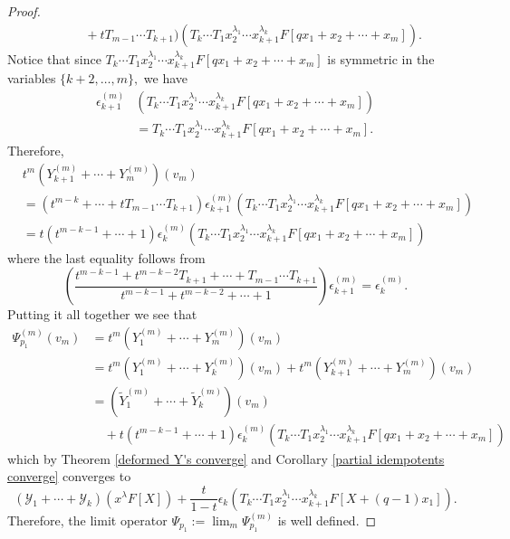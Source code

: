 \documentclass[ALCO,Unicode]{cedram}
\newcommand{\y}{{ \mathscr{Y} }}
\begin{document}
\begin{proof}
\begin{align*}
          & \qquad + tT_{m-1}\cdots T_{k+1}) \left( T_{k}\cdots T_1x_2^{\lambda_1}\cdots x_{k+1}^{\lambda_{k}}F[qx_1+x_2+ \cdots + x_m] \right).
    \end{align*}
Notice that since $T_{k}\cdots T_1x_2^{\lambda_1}\cdots x_{k+1}^{\lambda_{k}}F[qx_1+x_2+ \cdots + x_m]$ is symmetric in the variables $\{k+2,\ldots,m\},$ we have
\begin{align*}
\epsilon_{k+1}^{(m)}&(T_{k}\cdots T_1x_2^{\lambda_1}\cdots x_{k+1}^{\lambda_{k}}F[qx_1+x_2+ \cdots + x_m]) \\
&= T_{k}\cdots T_1x_2^{\lambda_1}\cdots x_{k+1}^{\lambda_{k}}F[qx_1+x_2+ \cdots + x_m].
\end{align*}
Therefore, 
\begin{align*}
    &t^m(Y_{k+1}^{(m)}+ \cdots + Y_{m}^{(m)})(v_m) \\
    &= (t^{m-k}+\cdots+ tT_{m-1}\cdots T_{k+1})\epsilon_{k+1}^{(m)}(T_{k}\cdots T_1x_2^{\lambda_1}\cdots x_{k+1}^{\lambda_{k}}F[qx_1+x_2+ \cdots + x_m]) \\
    &= t(t^{m-k-1}+ \cdots + 1)\epsilon_{k}^{(m)}(T_{k}\cdots T_1x_2^{\lambda_1}\cdots x_{k+1}^{\lambda_{k}}F[qx_1+x_2+ \cdots + x_m])
\end{align*}
where the last equality follows from 
$$\left( \frac{t^{m-k-1}+ t^{m-k-2}T_{k+1}+\cdots+ T_{m-1}\cdots T_{k+1}}{t^{m-k-1}+ t^{m-k-2}+\cdots + 1} \right) \epsilon_{k+1}^{(m)} = \epsilon_{k}^{(m)}.$$ 
Putting it all together we see that 
\begin{align*}
    \Psi_{p_1}^{(m)}(v_m) &= t^m(Y_1^{(m)}+\cdots+Y_m^{(m)})(v_m) \\
    &= t^m(Y_1^{(m)}+\cdots+Y_k^{(m)})(v_m) + t^m(Y_{k+1}^{(m)}+\cdots+Y_m^{(m)})(v_m) \\
    &= (\widetilde{Y}_{1}^{(m)}+ \cdots + \widetilde{Y}_{k}^{(m)})(v_m) \\
    & \quad + t(t^{m-k-1}+ \cdots + 1)\epsilon_{k}^{(m)}(T_{k}\cdots T_1x_2^{\lambda_1}\cdots x_{k+1}^{\lambda_{k}}F[qx_1+x_2+ \cdots + x_m])
\end{align*}
which by Theorem \ref{deformed Y's converge} and Corollary \ref{partial idempotents converge} converges to 
$$(\y_1+ \cdots + \y_k)(x^{\lambda}F[X]) + \frac{t}{1-t}\epsilon_{k}(T_k\cdots T_1x_2^{\lambda_1}\cdots x_{k+1}^{\lambda_k}F[X+(q-1)x_1]) .$$ Therefore, the limit operator $\Psi_{p_1}:= \lim_{m} \Psi_{p_1}^{(m)}$ is well defined. 


\end{proof}
\end{document}
